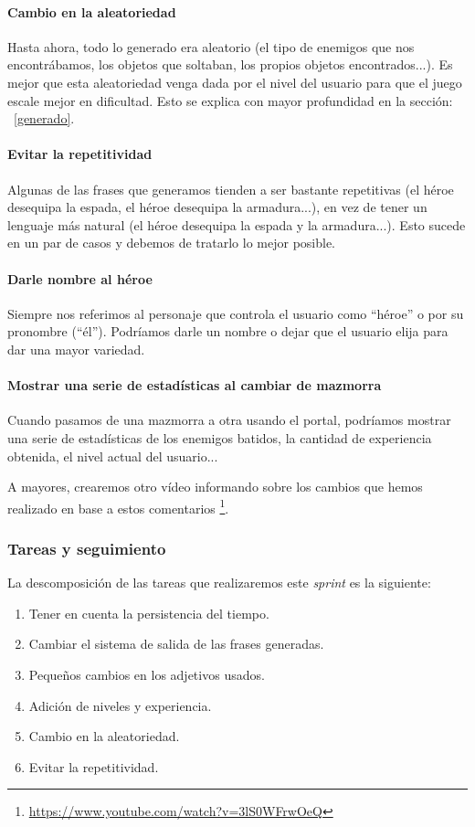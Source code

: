 \paragraph{Cambio en la aleatoriedad} Hasta ahora, todo lo generado era aleatorio (el tipo de enemigos que nos encontrábamos, los objetos que soltaban, los propios objetos encontrados...). Es mejor que esta aleatoriedad venga dada por el nivel del usuario para que el juego escale mejor en dificultad. Esto se explica con mayor profundidad en la sección: ~\ref{generado}.

\paragraph{Evitar la repetitividad} Algunas de las frases que generamos tienden a ser bastante repetitivas (el héroe desequipa la espada, el héroe desequipa la armadura...), en vez de tener un lenguaje más natural (el héroe desequipa la espada y la armadura...). Esto sucede en un par de casos y debemos de tratarlo lo mejor posible.

\paragraph{Darle nombre al héroe} Siempre nos referimos al personaje que controla el usuario como ``héroe'' o por su pronombre (``él''). Podríamos darle un nombre o dejar que el usuario elija para dar una mayor variedad.

\paragraph{Mostrar una serie de estadísticas al cambiar de mazmorra} Cuando pasamos de una mazmorra a otra usando el portal, podríamos mostrar una serie de estadísticas de los enemigos batidos, la cantidad de experiencia obtenida, el nivel actual del usuario...

A mayores, crearemos otro vídeo informando sobre los cambios que hemos realizado en base a estos comentarios \footnote{\url{https://www.youtube.com/watch?v=3lS0WFrwOeQ}}.

\subsubsection{Tareas y seguimiento}

La descomposición de las tareas que realizaremos este \textit{sprint} es la siguiente:

\begin{enumerate}[label=\bfseries WBS 8.\arabic*]
  \item Tener en cuenta la persistencia del tiempo.
  \item Cambiar el sistema de salida de las frases generadas.
  \item Pequeños cambios en los adjetivos usados.
  \item Adición de niveles y experiencia.
  \item Cambio en la aleatoriedad.
  \item Evitar la repetitividad.
\end{enumerate}

